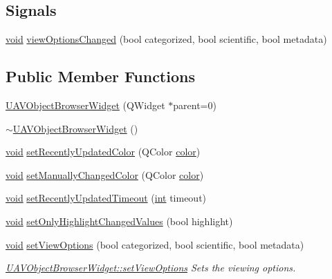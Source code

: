 \subsection*{Signals}
\begin{DoxyCompactItemize}
\item 
\hyperlink{group___u_a_v_objects_plugin_ga444cf2ff3f0ecbe028adce838d373f5c}{void} \hyperlink{group___u_a_v_object_browser_plugin_ga0fe8f51605067d863b1ac5bb6f6f5cbd}{view\-Options\-Changed} (bool categorized, bool scientific, bool metadata)
\end{DoxyCompactItemize}
\subsection*{Public Member Functions}
\begin{DoxyCompactItemize}
\item 
\hyperlink{group___u_a_v_object_browser_plugin_ga403353bfa1860704e97addda60292b5d}{U\-A\-V\-Object\-Browser\-Widget} (Q\-Widget $\ast$parent=0)
\item 
\hyperlink{group___u_a_v_object_browser_plugin_gacff305183afd2168e382970b086cf108}{$\sim$\-U\-A\-V\-Object\-Browser\-Widget} ()
\item 
\hyperlink{group___u_a_v_objects_plugin_ga444cf2ff3f0ecbe028adce838d373f5c}{void} \hyperlink{group___u_a_v_object_browser_plugin_gae78918a99387bda266b432b5ded9168e}{set\-Recently\-Updated\-Color} (Q\-Color \hyperlink{glext_8h_a3ea846f998d64f079b86052b6c4193a8}{color})
\item 
\hyperlink{group___u_a_v_objects_plugin_ga444cf2ff3f0ecbe028adce838d373f5c}{void} \hyperlink{group___u_a_v_object_browser_plugin_gaee39097c4bce5dcff47148b0bf22f9e7}{set\-Manually\-Changed\-Color} (Q\-Color \hyperlink{glext_8h_a3ea846f998d64f079b86052b6c4193a8}{color})
\item 
\hyperlink{group___u_a_v_objects_plugin_ga444cf2ff3f0ecbe028adce838d373f5c}{void} \hyperlink{group___u_a_v_object_browser_plugin_ga7c8fdd1c763ccc45089b7b7158f49630}{set\-Recently\-Updated\-Timeout} (\hyperlink{ioapi_8h_a787fa3cf048117ba7123753c1e74fcd6}{int} timeout)
\item 
\hyperlink{group___u_a_v_objects_plugin_ga444cf2ff3f0ecbe028adce838d373f5c}{void} \hyperlink{group___u_a_v_object_browser_plugin_ga964995701170a95cc21eb78fb25acb9d}{set\-Only\-Highlight\-Changed\-Values} (bool highlight)
\item 
\hyperlink{group___u_a_v_objects_plugin_ga444cf2ff3f0ecbe028adce838d373f5c}{void} \hyperlink{group___u_a_v_object_browser_plugin_ga21f21843b8cf0310d7cac16dbb79846c}{set\-View\-Options} (bool categorized, bool scientific, bool metadata)
\begin{DoxyCompactList}\small\item\em \hyperlink{group___u_a_v_object_browser_plugin_ga21f21843b8cf0310d7cac16dbb79846c}{U\-A\-V\-Object\-Browser\-Widget\-::set\-View\-Options} Sets the viewing options. \end{DoxyCompactList}\end{DoxyCompactItemize}


